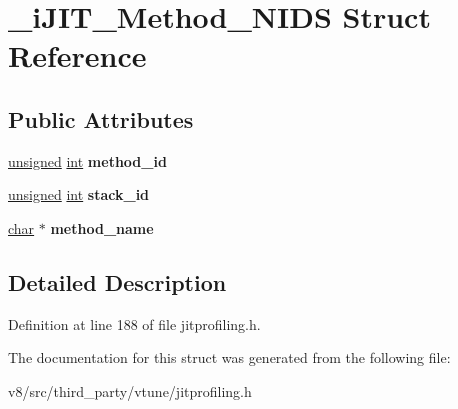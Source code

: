 \hypertarget{struct__iJIT__Method__NIDS}{}\section{\+\_\+i\+J\+I\+T\+\_\+\+Method\+\_\+\+N\+I\+DS Struct Reference}
\label{struct__iJIT__Method__NIDS}
\subsection*{Public Attributes}
\begin{DoxyCompactItemize}
\item 
\mbox{\label{struct__iJIT__Method__NIDS_a2caee5236406e074bf7d263f9e251063}} 
\mbox{\hyperlink{classunsigned}{unsigned}} \mbox{\hyperlink{classint}{int}} {\bfseries method\+\_\+id}
\item 
\mbox{\label{struct__iJIT__Method__NIDS_a990611a5e75c807c519089de8bbe3757}} 
\mbox{\hyperlink{classunsigned}{unsigned}} \mbox{\hyperlink{classint}{int}} {\bfseries stack\+\_\+id}
\item 
\mbox{\label{struct__iJIT__Method__NIDS_ae1fa90351a5f2b0b32f1ab25600d07fc}} 
\mbox{\hyperlink{classchar}{char}} $\ast$ {\bfseries method\+\_\+name}
\end{DoxyCompactItemize}


\subsection{Detailed Description}


Definition at line 188 of file jitprofiling.\+h.



The documentation for this struct was generated from the following file\+:\begin{DoxyCompactItemize}
\item 
v8/src/third\+\_\+party/vtune/jitprofiling.\+h\end{DoxyCompactItemize}
